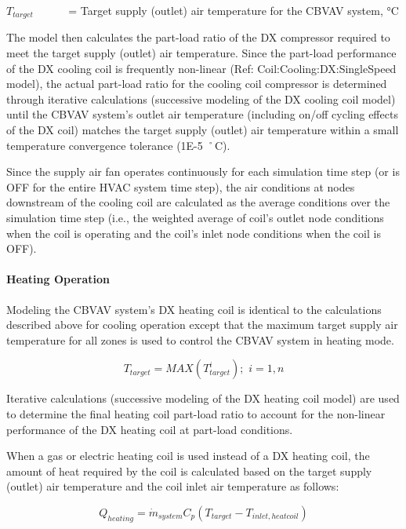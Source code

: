 \(T_{target}^{}\) ~~~~~ = Target supply (outlet) air temperature for the CBVAV system, °C

The model then calculates the part-load ratio of the DX compressor required to meet the target supply (outlet) air temperature. Since the part-load performance of the DX cooling coil is frequently non-linear (Ref: Coil:Cooling:DX:SingleSpeed model), the actual part-load ratio for the cooling coil compressor is determined through iterative calculations (successive modeling of the DX cooling coil model) until the CBVAV system's outlet air temperature (including on/off cycling effects of the DX coil) matches the target supply (outlet) air temperature within a small temperature convergence tolerance (1E-5 ˚C).

Since the supply air fan operates continuously for each simulation time step (or is OFF for the entire HVAC system time step), the air conditions at nodes downstream of the cooling coil are calculated as the average conditions over the simulation time step (i.e., the weighted average of coil's outlet node conditions when the coil is operating and the coil's inlet node conditions when the coil is OFF).

\paragraph{Heating Operation}\label{heating-operation}

Modeling the CBVAV system's DX heating coil is identical to the calculations described above for cooling operation except that the maximum target supply air temperature for all zones is used to control the CBVAV system in heating mode.

\begin{equation}
{T_{target}} = MAX\left( {T_{target}^i} \right);\,\,i = 1,n
\end{equation}

Iterative calculations (successive modeling of the DX heating coil model) are used to determine the final heating coil part-load ratio to account for the non-linear performance of the DX heating coil at part-load conditions.

When a gas or electric heating coil is used instead of a DX heating coil, the amount of heat required by the coil is calculated based on the target supply (outlet) air temperature and the coil inlet air temperature as follows:

\begin{equation}
{Q_{heating}} = {\dot m_{system}}{C_p}({T_{target}} - {T_{inlet,heatcoil}})
\end{equation}

